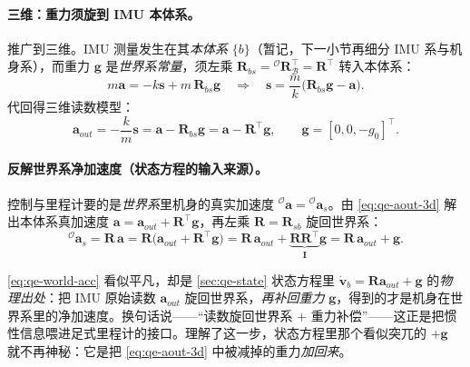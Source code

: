 \paragraph{三维：重力须旋到 IMU 本体系。}
推广到三维。IMU 测量发生在其\emph{本体系} $\{b\}$（暂记，下一小节再细分 IMU 系与机身系），而重力 $\boldsymbol{g}$ 是\emph{世界系常量}，须左乘 $\mathbf{R}_{bs}={}^{\mathcal{O}}\mathbf{R}_{\mathcal{B}}^\top=\mathbf{R}^\top$ 转入本体系\cite{unitree2023quadruped}：
\begin{equation}
  m\boldsymbol{a} = -k\boldsymbol{s} + m\,\mathbf{R}_{bs}\boldsymbol{g}
  \quad\Longrightarrow\quad
  \boldsymbol{s} = \frac{m}{k}\big(\mathbf{R}_{bs}\boldsymbol{g} - \boldsymbol{a}\big).
  \label{eq:qe-massspring-3d}
\end{equation}
代回得三维读数模型\cite{unitree2023quadruped}：
\begin{equation}
  \boxed{\;\boldsymbol{a}_{out} = -\frac{k}{m}\boldsymbol{s} = \boldsymbol{a} - \mathbf{R}_{bs}\boldsymbol{g} = \boldsymbol{a} - \mathbf{R}^\top\boldsymbol{g},\qquad \boldsymbol{g}=[0,0,-g_0]^\top.\;}
  \label{eq:qe-aout-3d}
\end{equation}

\paragraph{反解世界系净加速度（状态方程的输入来源）。}
控制与里程计要的是\emph{世界系}里机身的真实加速度 ${}^{\mathcal{O}}\boldsymbol{a}={}^{\mathcal{O}}\boldsymbol{a}_s$。由 \cref{eq:qe-aout-3d} 解出本体系真加速度 $\boldsymbol{a}=\boldsymbol{a}_{out}+\mathbf{R}^\top\boldsymbol{g}$，再左乘 $\mathbf{R}=\mathbf{R}_{sb}$ 旋回世界系：
\begin{equation}
  {}^{\mathcal{O}}\boldsymbol{a}_s = \mathbf{R}\,\boldsymbol{a}
  = \mathbf{R}\big(\boldsymbol{a}_{out}+\mathbf{R}^\top\boldsymbol{g}\big)
  = \mathbf{R}\,\boldsymbol{a}_{out} + \underbrace{\mathbf{R}\mathbf{R}^\top}_{\mathbf{I}}\boldsymbol{g}
  = \mathbf{R}\,\boldsymbol{a}_{out} + \boldsymbol{g}.
  \label{eq:qe-world-acc}
\end{equation}

\begin{insight}\label{ins:qe-world-acc}
\cref{eq:qe-world-acc} 看似平凡，却是 \cref{sec:qe-state} 状态方程里 $\dot{\boldsymbol{v}}_b=\mathbf{R}\boldsymbol{a}_{out}+\boldsymbol{g}$ 的\emph{物理出处}：把 IMU 原始读数 $\boldsymbol{a}_{out}$ 旋回世界系，\emph{再补回重力} $\boldsymbol{g}$，得到的才是机身在世界系里的净加速度。换句话说——“读数旋回世界系 $+$ 重力补偿”——这正是把惯性信息喂进足式里程计的接口。理解了这一步，状态方程里那个看似突兀的 $+\boldsymbol{g}$ 就不再神秘：它是把 \cref{eq:qe-aout-3d} 中被减掉的重力\emph{加回来}。
\end{insight}

